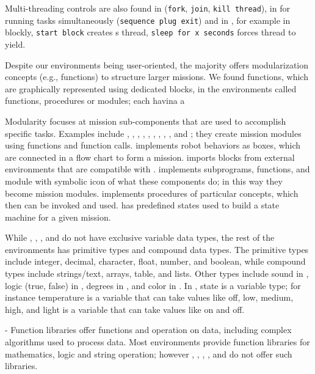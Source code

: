 Multi-threading controls are also found in \trik (\texttt{fork}, \texttt{join}, \texttt{kill thread}), in  \lego for running tasks simultaneously (\texttt{sequence plug exit}) and in \robotmesh, for example in blockly,  \texttt{start block} creates s thread, \texttt{sleep for x seconds} forces thread to yield. %

 Despite our environments being user-oriented, the majority offers modularization concepts (e.g., functions) to structure larger missions. We found functions, which are graphically represented using dedicated blocks, in the environments called functions, procedures or modules; each havina a

 Modularity focuses at mission sub-components that are used to accomplish specific tasks.
Examples include \metabot, \ardublockly, \openroberta, \choregraphe, \sphero, \robotmesh, \metabot, \makeblock, \ozoblockly, and \turtlebot; they create mission modules using functions and function calls. \choregraphe implements robot behaviors as boxes, which are connected in a flow chart to form a mission. \lego imports blocks from external environments that are compatible with \lego. \trik implements subprograms, functions, and module with symbolic icon of what these components do; in this way they become mission modules. \picaxe implements procedures of particular concepts, which then can be invoked and used.  \missionlab has predefined states used to build a state machine for a given mission. 


 While \flyaq, \missionlab, \tivipe, and \trik do not have exclusive variable data types, the rest of the environments has primitive types and compound data types. The primitive types include integer, decimal, character, float, number, and boolean, while compound types include strings/text, arrays, table, and lists. Other types include sound in \ozoblockly, logic (true, false) in \lego, degrees in \tello, and color in \sphero. In \aseba, state is a variable type;  for instance temperature is a variable that can take values like off, low, medium, high, and light is a variable that can take values like on and off. 

 - Function libraries offer functions and operation on data, including complex algorithms used to process data. Most environments provide function libraries for mathematics, logic and string operation; however \missionlab, \flyaq, \aseba, \codelab, and \tello do not offer such libraries. 

